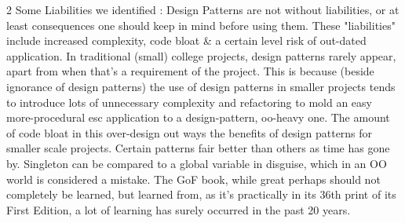 \begin{multicols}{2}
			\newline
			\newline
			Some Liabilities we identified :
			\newline
			\newline
			Design Patterns are not without liabilities, or at least consequences one should keep in mind before using them. These 
			"liabilities" include increased complexity, code bloat \& a certain level risk of out-dated application.
			\newline
			\newline
			In traditional (small) college projects, design patterns rarely appear, apart from when that’s a requirement of the project. 
			This is because (beside ignorance of design patterns) the use of design patterns in smaller projects tends to introduce lots of 
			unnecessary complexity and refactoring to mold an easy more-procedural esc application to a design-pattern, oo-heavy one. 
			The amount of code bloat in this over-design out ways the benefits of design patterns for smaller scale projects.
			\newline
			\newline
			Certain patterns fair better than others as time has gone by. Singleton can be compared to a global variable in disguise, 
			which in an OO world is considered a mistake. The GoF book, while great perhaps should not completely be learned, but learned 
			from, as it’s practically in its 36th print of its First Edition, a lot of learning has surely occurred in the past 20 years.
	
	\end{multicols}
